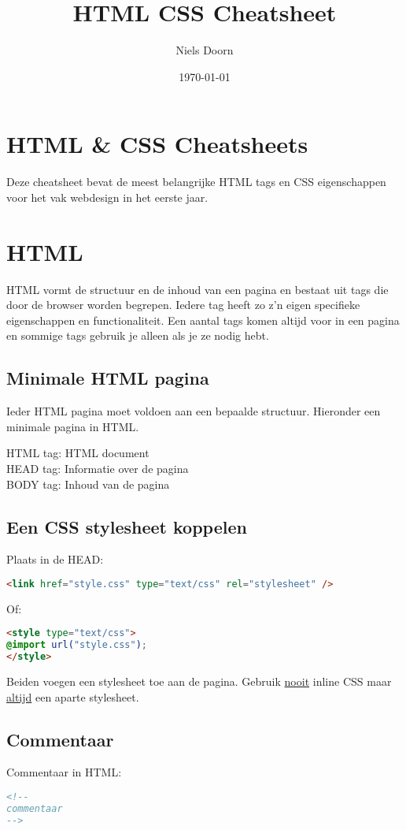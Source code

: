 \documentclass[8pt,pagesize,footinclude=false,headinclude=false]{scrartcl}
\title{HTML CSS Cheatsheet}
\author{Niels Doorn}
\date{\today}
\begin{document}
\ifpdf
{}
\else
{}
\fi

\begin{multicols*}{4}

\section*{HTML \& CSS Cheatsheets}
Deze cheatsheet bevat de meest belangrijke HTML tags en CSS eigenschappen voor het vak webdesign in het eerste jaar.

\section*{HTML}
HTML vormt de structuur en de inhoud van een pagina en bestaat uit tags die door de browser worden begrepen. Iedere tag heeft zo z'n eigen specifieke eigenschappen en functionaliteit. Een aantal tags komen altijd voor in een pagina en sommige tags gebruik je alleen als je ze nodig hebt.
\subsection*{Minimale HTML pagina}
Ieder HTML pagina moet voldoen aan een bepaalde structuur. Hieronder een minimale pagina in HTML.

HTML tag: HTML document\\
HEAD tag: Informatie over de pagina\\
BODY tag: Inhoud van de pagina

\subsection*{Een CSS stylesheet koppelen}
Plaats in de HEAD:
\begin{lstlisting}[language=HTML]
	<link href="style.css" type="text/css" rel="stylesheet" />
\end{lstlisting}
\noindent Of:
\begin{lstlisting}[language=HTML]
<style type="text/css">
@import url("style.css");
</style>
\end{lstlisting}
\noindent Beiden voegen een stylesheet toe aan de pagina. Gebruik \underline{nooit} inline CSS maar \underline{altijd} een aparte stylesheet.

\subsection*{Commentaar}
Commentaar in HTML:
\begin{lstlisting}[language=HTML]
<!--
commentaar
-->
\end{lstlisting}


\end{multicols*}
\end{document}

